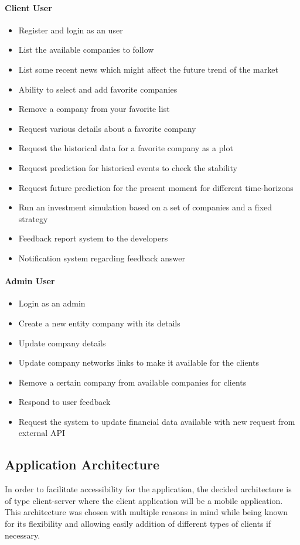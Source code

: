 \paragraph{Client User}
\begin{itemize}
    \item Register and login as an user
    \item List the available companies to follow
    \item List some recent news which might affect the future trend of the market
    \item Ability to select and add favorite companies
    \item Remove a company from your favorite list
    \item Request various details about a favorite company
    \item Request the historical data for a favorite company as a plot
    \item Request prediction for historical events to check the stability
    \item Request future prediction for the present moment for different time-horizons
    \item Run an investment simulation based on a set of companies and a fixed strategy
    \item Feedback report system to the developers
    \item Notification system regarding feedback answer
\end{itemize}

\paragraph{Admin User}
\begin{itemize}
    \item Login as an admin
    \item Create a new entity company with its details
    \item Update company details
    \item Update company networks links to make it available for the clients
    \item Remove a certain company from available companies for clients
    \item Respond to user feedback
    \item Request the system to update financial data available with new request from external API
\end{itemize}

\subsection{Application Architecture}
In order to facilitate accessibility for the application, the decided architecture is of type client-server where the client application will be a mobile application. This architecture was chosen with multiple reasons in mind while being known for its flexibility and allowing easily addition of different types of clients if necessary.

